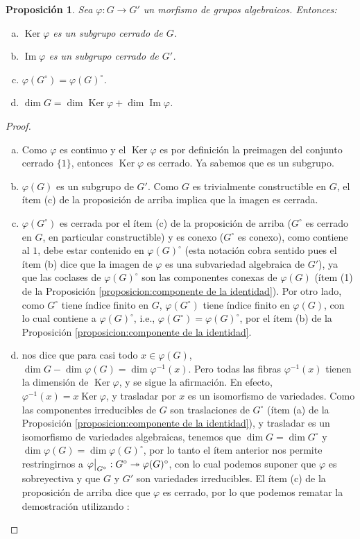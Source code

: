 \documentclass[spanish,12pt]{amsart}
\newtheorem{proposition}[theorem]{Proposición}
\theoremstyle{definition}
\theoremstyle{remark}
\numberwithin{equation}{section}
\newcommand{\Imagen}{\operatorname{Im}}
\newcommand{\Ker}{\operatorname{Ker}}
\newcommand\rest[2]{{%
  \left.\kern-\nulldelimiterspace %
  #1 %
  \vphantom{\big|} %
  \right|_{#2} %
  }}
\begin{document}
\begin{proposition}\label{proposition:la imagen de un morfismo de grupos algebraicos es cerrado}
Sea $\varphi : G \to G'$ un morfismo de grupos algebraicos. Entonces:
\begin{enumerate}[(a)]
\item $\Ker \varphi$ es un subgrupo cerrado de $G$.
\item $\Imagen \varphi$ es un subgrupo cerrado de $G'$.
\item $\varphi (G^\circ) = \varphi (G)^\circ$.
\item $\dim G = \dim \Ker \varphi + \dim \Imagen \varphi$.
\end{enumerate}
\end{proposition}
\begin{proof}
\begin{enumerate}[(a)]
\item Como $\varphi$ es continuo y el $\Ker \varphi$ es por definición la preimagen del conjunto cerrado $\{1\}$, entonces $\Ker \varphi$ es cerrado. Ya sabemos que es un subgrupo.
\item $\varphi (G)$ es un subgrupo de $G'$. Como $G$ es trivialmente constructible en $G$, el ítem (c) de la proposición de arriba implica que la imagen es cerrada.
\item $\varphi (G^\circ)$ es cerrada por el ítem (c) de la proposición de arriba ($G^\circ$ es cerrado en $G$, en particular constructible) y es conexo ($G^\circ$ es conexo), como contiene al $1$, debe estar contenido en $\varphi (G)^\circ$ (esta notación cobra sentido pues el ítem (b) dice que la imagen de $\varphi$ es una subvariedad algebraica de $G'$), ya que las coclases de $\varphi (G)^\circ$ son las componentes conexas de $\varphi (G)$ (ítem (1) de la Proposición \ref{proposicion:componente de la identidad}). Por otro lado, como $G^\circ$ tiene índice finito en $G$, $\varphi (G^\circ)$ tiene índice finito en $\varphi (G)$, con lo cual contiene a $\varphi (G)^\circ$, i.e., $\varphi (G^\circ) = \varphi (G)^\circ$, por el ítem (b) de la Proposición \ref{proposicion:componente de la identidad}.
\item \cite[Ítem (2) del Teorema 2.12.9]{notas_pedro} nos dice que para casi todo $x \in \varphi (G)$, $\dim G - \dim \varphi (G) = \dim \varphi^{-1} (x)$. Pero todas las fibras $\varphi^{-1} (x)$ tienen la dimensión de $\Ker \varphi$, y se sigue la afirmación. En efecto, $\varphi^{-1} (x) = x \Ker \varphi $, y trasladar por $x$ es un isomorfismo de variedades. Como las componentes irreducibles de $G$ son traslaciones de $G^\circ$ (ítem (a) de la Proposición \ref{proposicion:componente de la identidad}), y trasladar es un isomorfismo de variedades algebraicas, tenemos que $\dim G = \dim G^\circ$ y $\dim \varphi (G) = \dim \varphi (G)^\circ$, por lo tanto el ítem anterior nos permite restringirnos a $\rest \varphi {G^\circ} : G^\circ \twoheadrightarrow \varphi (G)^\circ$, con lo cual podemos suponer que $\varphi$ es sobreyectiva y que $G$ y $G'$ son variedades irreducibles. El ítem (c) de la proposición de arriba dice que $\varphi$ es cerrado, por lo que podemos rematar la demostración utilizando \cite[Teorema 2.12.13]{notas_pedro}:

\end{enumerate}
\end{proof}
\end{document}
